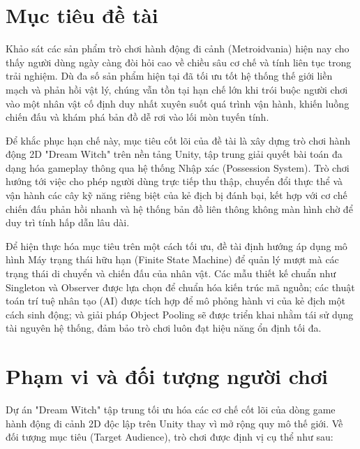 \documentclass[../DoAn.tex]{subfiles}
\begin{document}
\newpage

\section{Mục tiêu đề tài}
\label{section:1.2}
Khảo sát các sản phẩm trò chơi hành động đi cảnh (Metroidvania) hiện nay cho thấy người dùng ngày càng đòi hỏi cao về chiều sâu cơ chế và tính liên tục trong trải nghiệm. Dù đa số sản phẩm hiện tại đã tối ưu tốt hệ thống thế giới liền mạch và phản hồi vật lý, chúng vẫn tồn tại hạn chế lớn khi trói buộc người chơi vào một nhân vật cố định duy nhất xuyên suốt quá trình vận hành, khiến luồng chiến đấu và khám phá bản đồ dễ rơi vào lối mòn tuyến tính.

Để khắc phục hạn chế này, mục tiêu cốt lõi của đề tài là xây dựng trò chơi hành động 2D "Dream Witch" trên nền tảng Unity, tập trung giải quyết bài toán đa dạng hóa gameplay thông qua hệ thống Nhập xác (Possession System). Trò chơi hướng tới việc cho phép người dùng trực tiếp thu thập, chuyển đổi thực thể và vận hành các cây kỹ năng riêng biệt của kẻ địch bị đánh bại, kết hợp với cơ chế chiến đấu phản hồi nhanh và hệ thống bản đồ liên thông không màn hình chờ để duy trì tính hấp dẫn lâu dài.

Để hiện thực hóa mục tiêu trên một cách tối ưu, đề tài định hướng áp dụng mô hình Máy trạng thái hữu hạn (Finite State Machine) để quản lý mượt mà các trạng thái di chuyển và chiến đấu của nhân vật. Các mẫu thiết kế chuẩn như Singleton và Observer được lựa chọn để chuẩn hóa kiến trúc mã nguồn; các thuật toán trí tuệ nhân tạo (AI) được tích hợp để mô phỏng hành vi của kẻ địch một cách sinh động; và giải pháp Object Pooling sẽ được triển khai nhằm tái sử dụng tài nguyên hệ thống, đảm bảo trò chơi luôn đạt hiệu năng ổn định tối đa. 

\newpage

\section{Phạm vi và đối tượng người chơi}
\label{section:1.3}

Dự án "Dream Witch" tập trung tối ưu hóa các cơ chế cốt lõi của dòng game hành động đi cảnh 2D độc lập trên Unity thay vì mở rộng quy mô thế giới. Về đối tượng mục tiêu (Target Audience), trò chơi được định vị cụ thể như sau:
\end{document}
